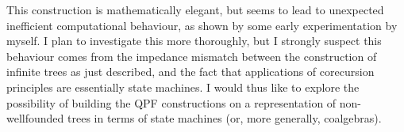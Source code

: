 \documentclass[a4paper]{scrartcl}
\begin{document}
This construction is mathematically elegant, but seems to lead to
unexpected inefficient computational behaviour, as shown by some early
experimentation by myself. I plan to investigate this more thoroughly,
but I strongly suspect this behaviour comes from the impedance mismatch
between the construction of infinite trees as just described, and the
fact that applications of corecursion principles are essentially state
machines. I would thus like to explore the possibility of building the
QPF constructions on a representation of non-wellfounded trees in terms
of state machines (or, more generally, coalgebras).





% 


% 












\end{document}
